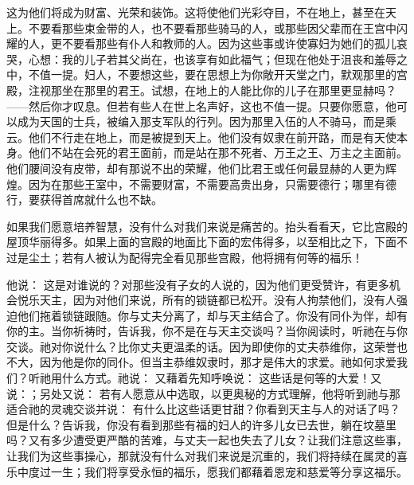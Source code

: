 这为他们将成为财富、光荣和装饰。这将使他们光彩夺目，不在地上，甚至在天上。不要看那些束金带的人，也不要看那些骑马的人，或那些因父辈而在王宫中闪耀的人，更不要看那些有仆人和教师的人。因为这些事或许使寡妇为她们的孤儿哀哭，心想：我的儿子若其父尚在，也该享有如此福气；但现在他处于沮丧和羞辱之中，不值一提。妇人，不要想这些，要在思想上为你敞开天堂之门，默观那里的宫殿，注视那坐在那里的君王。试想，在地上的人能比你的儿子在那里更显赫吗？——然后你才叹息。但若有些人在世上名声好，这也不值一提。只要你愿意，他可以成为天国的士兵，被编入那支军队的行列。因为那里入伍的人不骑马，而是乘云。他们不行走在地上，而是被提到天上。他们没有奴隶在前开路，而是有天使本身。他们不站在会死的君王面前，而是站在那不死者、万王之王、万主之主面前。他们腰间没有皮带，却有那说不出的荣耀，他们比君王或任何最显赫的人更为辉煌。因为在那些王室中，不需要财富，不需要高贵出身，只需要德行；哪里有德行，要获得首席就什么也不缺。\par

如果我们愿意培养智慧，没有什么对我们来说是痛苦的。抬头看看天，它比宫殿的屋顶华丽得多。如果上面的宫殿的地面比下面的宏伟得多，以至相比之下，下面不过是尘土；若有人被认为配得完全看见那些宫殿，他将拥有何等的福乐！\par

他说： 这是对谁说的？对那些没有子女的人说的，因为他们更受赞许，有更多机会悦乐天主，因为对他们来说，所有的锁链都已松开。没有人拘禁他们，没有人强迫他们拖着锁链跟随。你与丈夫分离了，却与天主结合了。你没有同仆为伴，却有你的主。当你祈祷时，告诉我，你不是在与天主交谈吗？当你阅读时，听祂在与你交谈。祂对你说什么？比你丈夫更温柔的话。因为即使你的丈夫恭维你，这荣誉也不大，因为他是你的同仆。但当主恭维奴隶时，那才是伟大的求爱。祂如何求爱我们？听祂用什么方式。祂说： 又藉着先知呼唤说： 这些话是何等的大爱！又说：；另处又说： 若有人愿意从中选取，以更奥秘的方式理解，他将听到祂与那适合祂的灵魂交谈并说： 有什么比这些话更甘甜？你看到天主与人的对话了吗？但是什么？告诉我，你没有看到那些有福的妇人的许多儿女已去世，躺在坟墓里吗？又有多少遭受更严酷的苦难，与丈夫一起也失去了儿女？让我们注意这些事，让我们为这些事操心，那就没有什么对我们来说是沉重的，我们将持续在属灵的喜乐中度过一生；我们将享受永恒的福乐，愿我们都藉着恩宠和慈爱等分享这福乐。\par

